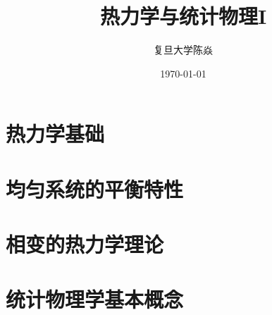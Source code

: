 \documentclass[UTF8]{ctexbook}
\title{
	\vspace{-4 cm}
	\bfseries
	热力学与统计物理I
}
\author{
	\CJKfamily{楷体}
	复旦大学\phantom{空格}陈焱
}
\date{
	\CJKfamily{楷体}
	\today
}
\numberwithin{equation}{section}
\theoremstyle{empty} %
\theoremstyle{empty} %
\theoremstyle{plain} %
\let \oldInclude = 
\renewcommand{}[1]{{\let \clearpage = \relax \oldInclude{#1}}}
\begin{document}
%	
%			
%			
%			
%			
%			
		\chapter{热力学基础}
			
			
		\chapter{均匀系统的平衡特性}
			
			
		\chapter{相变的热力学理论}
			
			
%			
%			
		\chapter{统计物理学基本概念}
			
		
%			
%		
%			
%		
%			
		
\end{document}
